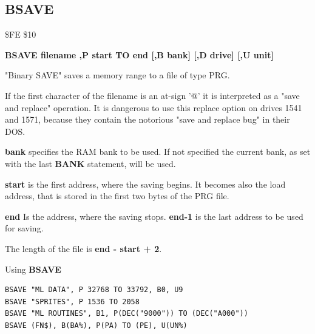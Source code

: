 
\newpage
\subsection{BSAVE}
\begin{description}[leftmargin=2cm,style=nextline]
\item [Token:] \$FE \$10
\item [Format:] {\bf BSAVE filename ,P start TO end
                [,B bank] [,D drive] [,U unit] }
\item [Usage:]
   "Binary SAVE" saves a memory range to
   a file of type PRG.

   \filenamedefinition
   If the first character of the filename is an at-sign '@' it
   is interpreted as a "save and replace" operation. It is dangerous
   to use this replace option on drives 1541 and 1571, because they
   contain the notorious "save and replace bug" in their DOS.

   {\bf bank} specifies the RAM bank to be used.
   If not specified the current bank, as set with the last
   {\bf BANK} statement, will be used.

   {\bf start} is the first address, where the saving begins.
   It becomes also the load address,
   that is stored in the first two bytes of the PRG file.

   {\bf end} Is the address, where the saving stops.
   {\bf end-1} is the last address to be used for saving.

   \drivedefinition

   \unitdefinition

\item [Remarks:]
   The length of the file is {\bf end - start + 2}.

\item [Example:] Using {\bf BSAVE}
\begin{tcolorbox}[colback=black,coltext=white]
\verbatimfont{\codefont}
\begin{verbatim}
BSAVE "ML DATA", P 32768 TO 33792, B0, U9
BSAVE "SPRITES", P 1536 TO 2058
BSAVE "ML ROUTINES", B1, P(DEC("9000")) TO (DEC("A000"))
BSAVE (FN$), B(BA%), P(PA) TO (PE), U(UN%)
\end{verbatim}
\end{tcolorbox}
\end{description}


\newpage
